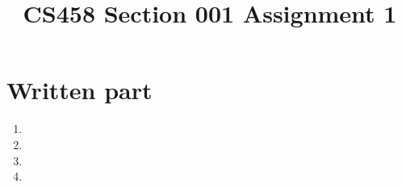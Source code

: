 \documentclass[12pt]{article}
\title{CS458 Section 001 Assignment 1}
\begin{document}
\maketitle

\section*{Written part}
\begin{enumerate}
\item

\item

\item

\item

\end{enumerate}
\end{document}
